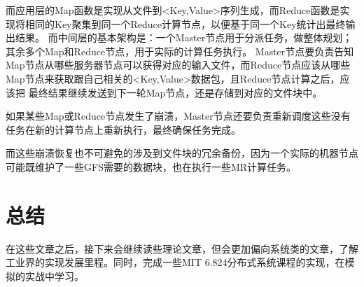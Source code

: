 \documentclass[UTF8]{article}
\begin{document}
而应用层的Map函数是实现从文件到<Key,Value>序列生成，而Reduce函数是实现将相同的Key聚集到同一个Reduce计算节点，以便基于同一个Key统计出最终输出结果。
而中间层的基本架构是：一个Master节点用于分派任务，做整体规划；其余多个Map和Reduce节点，用于实际的计算任务执行。
Master节点要负责告知Map节点从哪些服务器节点可以获得对应的输入文件，而Reduce节点应该从哪些Map节点来获取跟自己相关的<Key,Value>数据包，且Reduce节点计算之后，应该把
最终结果继续发送到下一轮Map节点，还是存储到对应的文件块中。

如果某些Map或Reduce节点发生了崩溃，Master节点还要负责重新调度这些没有任务在新的计算节点上重新执行，最终确保任务完成。

而这些崩溃恢复也不可避免的涉及到文件块的冗余备份，因为一个实际的机器节点可能既维护了一些GFS需要的数据块，也在执行一些MR计算任务。

\section{总结}
在这些文章之后，接下来会继续读些理论文章，但会更加偏向系统类的文章，了解工业界的实现发展里程。同时，完成一些MIT 6.824分布式系统课程的实现，在模拟的实战中学习。
\end{document}
